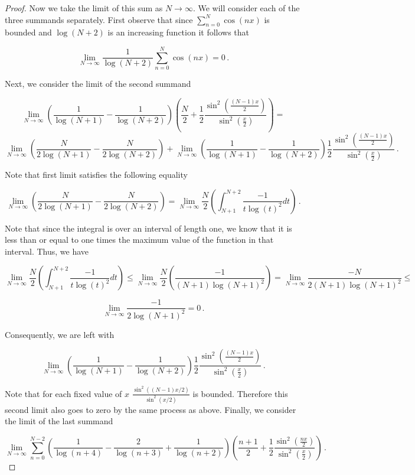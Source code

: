 \documentclass[a4paper]{article}
\numberwithin{equation}{section}
\begin{document}
\begin{description}
\begin{proof}
Now we take the limit of this sum as $N \rightarrow \infty$. We will consider each of the three summands separately. First observe that since $\sum_{n=0}^N\cos(nx)$ is bounded and $\log(N+2)$ is an increasing function it follows that

$$\lim\limits_{N \rightarrow \infty}\frac{1}{\log(N+2)}\sum \limits_{n=0}^N\cos(nx) = 0\,.$$

Next, we consider the limit of the second summand

$$\lim\limits_{N \rightarrow \infty}\left( \frac{1}{\log(N+1)} -\frac{1}{\log(N+2)} \right)\left(\frac{N}{2} + \frac{1}{2}\frac{\sin^2(\frac{(N-1)x}{2})}{\sin^2(\frac{x}{2})}\right) = $$
$$\lim\limits_{N \rightarrow \infty}\left( \frac{N}{2\log(N+1)} -\frac{N}{2\log(N+2)} \right)+\lim\limits_{N \rightarrow \infty}\left( \frac{1}{\log(N+1)} -\frac{1}{\log(N+2)} \right) \frac{1}{2}\frac{\sin^2(\frac{(N-1)x}{2})}{\sin^2(\frac{x}{2})}\,.$$

Note that first limit satisfies the following equality

$$\lim\limits_{N \rightarrow \infty}\left( \frac{N}{2\log(N+1)} -\frac{N}{2\log(N+2)} \right) = \lim \limits_{N \rightarrow \infty}\frac{N}{2} \left(\int_{N+1}^{N+2}\frac{-1}{t\log(t)^2}dt\right)\,.$$

Note that since the integral is over an interval of length one, we know that it is less than or equal to one times the maximum value of the function in that interval. Thus, we have

$$\lim \limits_{N \rightarrow \infty}\frac{N}{2} \left(\int_{N+1}^{N+2}\frac{-1}{t\log(t)^2}dt\right)\leq \lim \limits_{N \rightarrow \infty}\frac{N}{2} \left(\frac{-1}{(N+1)\log(N+1)^2}\right) = \lim \limits_{N \rightarrow \infty} \frac{-N}{2(N+1)\log(N+1)^2} \leq$$

$$\lim \limits_{N \rightarrow \infty} \frac{-1}{2\log(N+1)^2} = 0 \,.$$

Consequently, we are left with

$$\lim\limits_{N \rightarrow \infty}\left( \frac{1}{\log(N+1)} -\frac{1}{\log(N+2)} \right) \frac{1}{2}\frac{\sin^2(\frac{(N-1)x}{2})}{\sin^2(\frac{x}{2})}\,.$$

Note that for each fixed value of $x$ $\frac{\sin^2((N-1)x/2)}{\sin^2(x/2)}$ is bounded. Therefore this second limit also goes to zero by the same process as above. Finally, we consider the limit of the last summand

$$\lim\limits_{N \rightarrow \infty}\sum \limits_{n=0}^{N-2}\left( \frac{1}{\log(n+4)} -\frac{2}{\log(n+3)} +\frac{1}{\log(n+2)} \right)\left(\frac{n+1}{2} + \frac{1}{2}\frac{\sin^2(\frac{nx}{2})}{\sin^2(\frac{x}{2})}\right)\,.$$


\end{proof}
\end{description}
\end{document}
